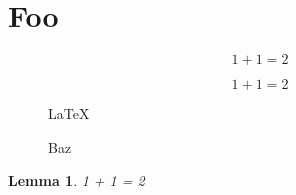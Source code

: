 \documentclass{article}
\newtheorem{lemma}{Lemma}
\begin{document}
\section{Foo}%
\label{sec:foo}

\begin{equation}%
\label{eq:foo}
    1 + 1 = 2
\end{equation}

\begin{equation}%
\label{eq:bar}
    1 + 1 = 2
\end{equation}

\begin{figure}%
\LaTeX{}
\caption{Baz}%
\label{fig:baz}
\end{figure}

\begin{lemma}%
\label{thm:foo}
    1 + 1 = 2
\end{lemma}


\end{document}
